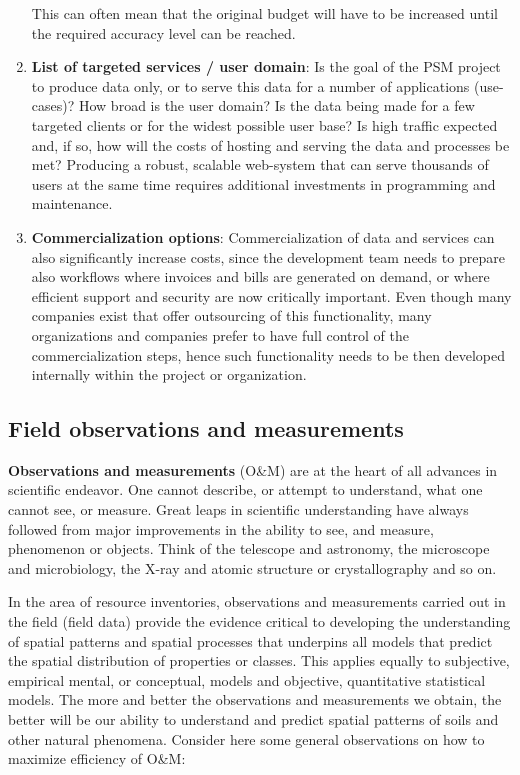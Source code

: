 \documentclass[graybox,natbib,nospthms,UStrade]{svmono}
\begin{document}
\begin{enumerate}
  This can often mean that the original budget will have to be
  increased until the required accuracy level can be reached.
\item
  \textbf{List of targeted services / user domain}: Is the goal of the PSM
  project to produce data only, or to serve this data for a number
  of applications (use-cases)? How broad is the user domain? Is the
  data being made for a few targeted clients or for the widest
  possible user base? Is high traffic expected and, if so, how will
  the costs of hosting and serving the data and processes be met?
  Producing a robust, scalable web-system that can serve thousands
  of users at the same time requires additional investments in
  programming and maintenance.
\item
  \textbf{Commercialization options}: Commercialization of data and
  services can also significantly increase costs, since the
  development team needs to prepare also workflows where invoices
  and bills are generated on demand, or where efficient support and
  security are now critically important. Even though many companies
  exist that offer outsourcing of this functionality, many
  organizations and companies prefer to have full control of the
  commercialization steps, hence such functionality needs to be then
  developed internally within the project or organization.
\end{enumerate}

\hypertarget{field-observations-and-measurements}{%
\subsection{Field observations and measurements}\label{field-observations-and-measurements}}

\textbf{Observations and measurements} (O\&M) are at the heart of all advances in
scientific endeavor. One cannot describe, or attempt to understand,
what one cannot see, or measure. Great leaps in scientific understanding
have always followed from major improvements in the ability to see, and
measure, phenomenon or objects. Think of the telescope and astronomy,
the microscope and microbiology, the X-ray and atomic structure or
crystallography and so on.

In the area of resource inventories, observations and measurements
carried out in the field (field data) provide the evidence critical to
developing the understanding of spatial patterns and spatial processes
that underpins all models that predict the spatial distribution of
properties or classes. This applies equally to subjective, empirical
mental, or conceptual, models and objective, quantitative statistical
models. The more and better the observations and measurements we obtain,
the better will be our ability to understand and predict spatial
patterns of soils and other natural phenomena. Consider here some
general observations on how to maximize efficiency of O\&M:
\end{document}
